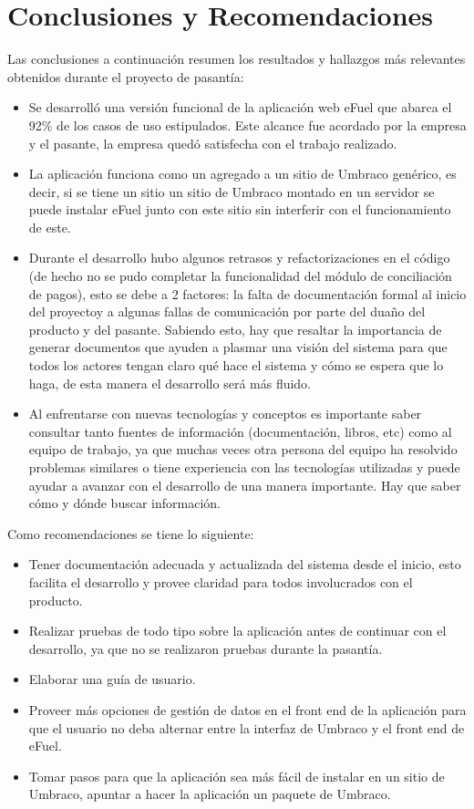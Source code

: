 \chapter*{Conclusiones y Recomendaciones}
Las conclusiones a continuación resumen los resultados y hallazgos más relevantes obtenidos durante el proyecto de pasantía:

\begin{itemize}
    \item Se desarrolló una versión funcional de la aplicación web eFuel que abarca el 92\% de los casos de uso estipulados. Este alcance fue acordado por la empresa y el pasante, la empresa quedó satisfecha con el trabajo realizado.
    \item La aplicación funciona como un agregado a un sitio de Umbraco genérico, es decir, si se tiene un sitio un sitio de Umbraco montado en un servidor se puede instalar eFuel junto con este sitio sin interferir con el funcionamiento de este.
    \item Durante el desarrollo hubo algunos retrasos y refactorizaciones en el código (de hecho no se pudo completar la funcionalidad del módulo de conciliación de pagos), esto se debe a 2 factores: la falta de documentación formal al inicio del proyectoy a algunas fallas de comunicación por parte del duaño del producto y del pasante. Sabiendo esto, hay que resaltar la importancia de generar documentos que ayuden a plasmar una visión del sistema para que todos los actores tengan claro qué hace el sistema y cómo se espera que lo haga, de esta manera el desarrollo será más fluido.
    \item Al enfrentarse con nuevas tecnologías y conceptos es importante saber consultar tanto fuentes de información (documentación, libros, etc) como al equipo de trabajo, ya que muchas veces otra persona del equipo ha resolvido problemas similares o tiene experiencia con las tecnologías utilizadas y puede ayudar a avanzar con el desarrollo de una manera importante. Hay que saber cómo y dónde buscar información.
\end{itemize}

Como recomendaciones se tiene lo siguiente:
\begin{itemize}
    \item Tener documentación adecuada y actualizada del sistema desde el inicio, esto facilita el desarrollo y provee claridad para todos involucrados con el producto.
    \item Realizar pruebas de todo tipo sobre la aplicación antes de continuar con el desarrollo, ya que no se realizaron pruebas durante la pasantía.
    \item Elaborar una guía de usuario.
    \item Proveer más opciones de gestión de datos en el front end de la aplicación para que el usuario no deba alternar entre la interfaz de Umbraco y el front end de eFuel.
    \item Tomar pasos para que la aplicación sea más fácil de instalar en un sitio de Umbraco, apuntar a hacer la aplicación un paquete de Umbraco.
\end{itemize}

